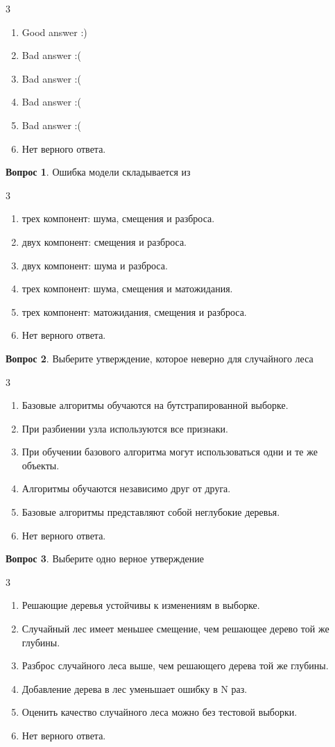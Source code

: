 \documentclass[12pt]{article}
\newenvironment{answerlist}[1][3]{
\begin{multicols}{#1}

\begin{enumerate}[label=\fbox{\emph{\Alph*}},ref=\emph{\alph*}]
}
{
\item Нет верного ответа.
\end{enumerate}
\end{multicols}
}
\theoremstyle{definition}
\newtheorem{question}{Вопрос}
\begin{document}
\begin{solution}
\begin{answerlist}
  \item Good answer :)
  \item Bad answer :(
  \item Bad answer :(
  \item Bad answer :(
  \item Bad answer :(
\end{answerlist}
\end{solution}

\begin{question}
Ошибка модели складывается из
\begin{answerlist}
  \item трех компонент: шума, смещения и разброса.
  \item двух компонент: смещения и разброса.
  \item двух компонент: шума и разброса.
  \item трех компонент: шума, смещения и матожидания.
  \item трех компонент: матожидания, смещения и разброса.

\end{answerlist}
\end{question}

\begin{question}
Выберите утверждение, которое неверно для случайного леса
\begin{answerlist}
  \item Базовые алгоритмы обучаются на бутстрапированной выборке.
  \item При разбиении узла используются все признаки.
  \item При обучении базового алгоритма могут использоваться одни и те же объекты.
  \item Алгоритмы обучаются независимо друг от друга.
  \item Базовые алгоритмы представляют собой неглубокие деревья.
\end{answerlist}
\end{question}

\begin{question}
Выберите одно верное утверждение
\begin{answerlist}
  \item Решающие деревья устойчивы к изменениям в выборке.
  \item Случайный лес имеет меньшее смещение, чем решающее дерево той же глубины.
  \item Разброс случайного леса выше, чем решающего дерева той же глубины.
  \item Добавление дерева в лес уменьшает ошибку в N раз.
  \item Оценить качество случайного леса можно без тестовой выборки.

\end{answerlist}
\end{question}
\end{document}

